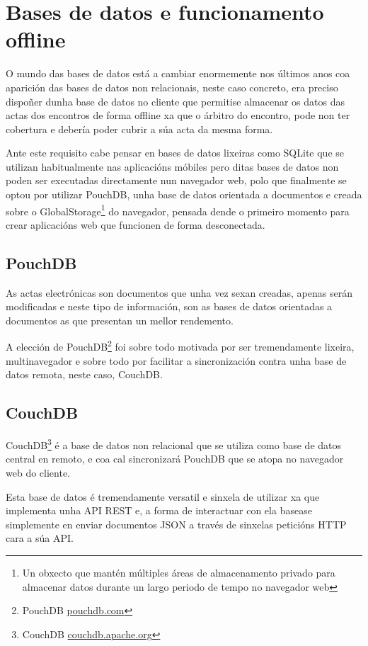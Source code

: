   \section{Bases de datos e funcionamento offline}
  \label{sec:design:db}
  O mundo das bases de datos está a cambiar enormemente nos últimos anos coa 
aparición das bases de datos non relacionais\cite{book:nosql}, neste caso 
concreto, era preciso 
dispoñer dunha base de datos no cliente que permitise almacenar os 
datos das actas dos encontros de forma offline xa que o árbitro do encontro, 
pode non ter cobertura e debería poder cubrir a súa acta da mesma forma.

  Ante este requisito cabe pensar en bases de datos lixeiras como SQLite que 
se utilizan habitualmente nas aplicacións móbiles pero ditas bases de datos non 
poden ser executadas directamente nun navegador web, polo que finalmente se 
optou por utilizar PouchDB, unha base de datos orientada a documentos e creada 
sobre o GlobalStorage\footnote{Un obxecto que mantén múltiples áreas de 
almacenamento privado para almacenar datos durante un largo periodo de tempo 
no navegador web} 
do navegador, pensada dende o primeiro momento para crear aplicacións web que 
funcionen de forma desconectada.

    \subsection{PouchDB}
    As actas electrónicas son documentos que unha vez sexan creadas, apenas 
serán modificadas e neste tipo de información, son as bases de datos orientadas 
a documentos as que presentan un mellor rendemento.

    A elección de PouchDB\footnote{PouchDB 
\href{https://pouchdb.com/}{pouchdb.com}} foi sobre 
todo motivada por ser 
tremendamente lixeira, multinavegador e sobre todo por facilitar a 
sincronización contra unha base de datos remota, neste caso, CouchDB.

    \subsection{CouchDB}
    CouchDB\footnote{CouchDB 
\href{http://couchdb.apache.org/}{couchdb.apache.org}} é a base 
de datos non relacional que se utiliza 
como base de datos central en remoto, e coa cal sincronizará PouchDB que se 
atopa no navegador web do cliente.

    Esta base de datos é tremendamente versatil e sinxela de utilizar xa que 
implementa unha API REST e, a forma de interactuar con ela basease simplemente 
en enviar documentos JSON a través de sinxelas peticións HTTP cara a súa API.

